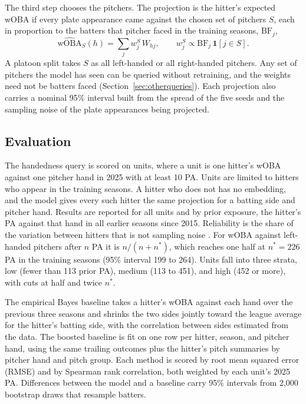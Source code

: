 \documentclass[11pt,letterpaper]{article}
\let\oldsubsection\subsection
\renewcommand\subsection{\FloatBarrier\oldsubsection}
\begin{document}
The third step chooses the pitchers. The projection is the hitter's expected wOBA if every plate appearance came against the chosen set of pitchers $S$, each in proportion to the batters that pitcher faced in the training seasons, $\text{BF}_j$,
\begin{equation}
\widehat{\text{wOBA}}_S(h) = \sum_{j} w^S_j \, W_{hj}, \qquad w^S_j \propto \text{BF}_j \, \mathbf{1}[j \in S].
\label{eq:query}
\end{equation}
A platoon split takes $S$ as all left-handed or all right-handed pitchers. Any set of pitchers the model has seen can be queried without retraining, and the weights need not be batters faced (Section~\ref{sec:otherqueries}). Each projection also carries a nominal 95\% interval built from the spread of the five seeds and the sampling noise of the plate appearances being projected.

\subsection{Evaluation}
\label{sec:eval}

The handedness query is scored on units, where a unit is one hitter's wOBA against one pitcher hand in 2025 with at least 10 PA. Units are limited to hitters who appear in the training seasons. A hitter who does not has no embedding, and the model gives every such hitter the same projection for a batting side and pitcher hand. Results are reported for all units and by prior exposure, the hitter's PA against that hand in all earlier seasons since 2015. Reliability is the share of the variation between hitters that is not sampling noise \citep{franks2016}. For wOBA against left-handed pitchers after $n$ PA it is $n/(n+n^*)$, which reaches one half at $n^* = 226$ PA in the training seasons (95\% interval 199 to 264). Units fall into three strata, low (fewer than 113 prior PA), medium (113 to 451), and high (452 or more), with cuts at half and twice $n^*$.

The empirical Bayes baseline takes a hitter's wOBA against each hand over the previous three seasons and shrinks the two sides jointly toward the league average for the hitter's batting side, with the correlation between sides estimated from the data. The boosted baseline is fit on one row per hitter, season, and pitcher hand, using the same trailing outcomes plus the hitter's pitch summaries by pitcher hand and pitch group. Each method is scored by root mean squared error (RMSE) and by Spearman rank correlation, both weighted by each unit's 2025 PA. Differences between the model and a baseline carry 95\% intervals from 2,000 bootstrap draws that resample batters.
\end{document}
